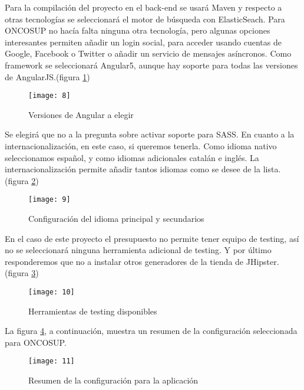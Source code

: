 Para la compilación del proyecto en el back-end se usará Maven y respecto a otras tecnologías se seleccionará el motor de búsqueda con ElasticSeach. Para ONCOSUP no hacía falta ninguna otra tecnología, pero algunas opciones interesantes permiten añadir un login social, para acceder usando cuentas de Google, Facebook o Twitter o añadir un servicio de mensajes asíncronos. Como framework se seleccionará Angular5, aunque hay soporte para todas las versiones de AngularJS.(figura \ref{fig:8})

\begin{figure}[!h]
\begin{center}
\texttt{[image: 8]}
\caption{Versiones de Angular a elegir}
\label{fig:8}
\end{center}
\end{figure} 

Se elegirá que no a la pregunta sobre activar soporte para SASS. En cuanto a la internacionalización, en este caso, si queremos tenerla. Como idioma nativo seleccionamos español, y como idiomas adicionales catalán e inglés. La internacionalización permite añadir tantos idiomas como se desee de la lista. (figura \ref{fig:9})

\begin{figure}[!h]
\begin{center}
\texttt{[image: 9]}
\caption{Configuración del idioma principal y secundarios}
\label{fig:9}
\end{center}
\end{figure}

En el caso de este proyecto el presupuesto no permite tener equipo de testing, así no se seleccionará ninguna herramienta adicional de testing. Y por último responderemos que no a instalar otros generadores de la tienda de JHipster. (figura \ref{fig:10})

\begin{figure}[!h]
\begin{center}
\texttt{[image: 10]}
\caption{Herramientas de testing disponibles}
\label{fig:10}
\end{center}
\end{figure} 
\clearpage
La figura \ref{fig:11}, a continuación, muestra un resumen de la configuración seleccionada para ONCOSUP.

\begin{figure}[!h]
\begin{center}
\texttt{[image: 11]}
\caption{Resumen de la configuración para la aplicación}
\label{fig:11}
\end{center}
\end{figure} 

